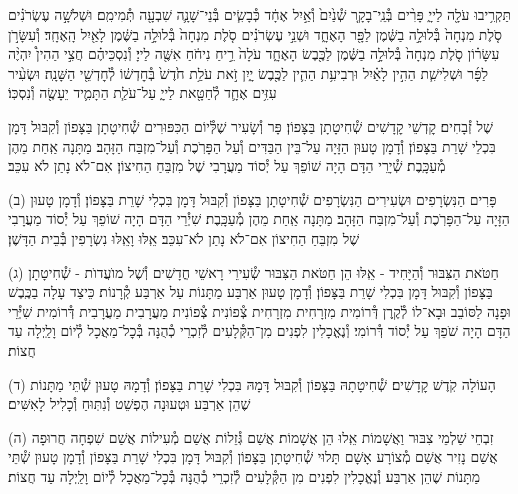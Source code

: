 \documentclass[twoside, openany, parskip=half, 11pt]{book}
\begin{document}
תַּקְרִ֥יבוּ עֹלָ֖ה לַייָ֑ פָּרִ֨ים בְּ֯נֵֽי־בָקָ֤ר שְׁ֯נַ֙יִם֙ וְ֯אַ֣יִל אֶחָ֔ד כְּ֯בָשִׂ֧ים בְּ֯נֵי־שָׁנָ֛ה שִׁבְעָ֖ה תְּ֯מִימִֽם׃
וּשְׁלֹשָׁ֣ה עֶשְׂרֹנִ֗ים סֹ֤לֶת מִנְחָה֙ בְּ֯לוּלָ֣ה בַשֶּׁ֔מֶן לַפָּ֖ר הָאֶחָ֑ד וּשְׁנֵ֣י עֶשְׂרֹנִ֗ים סֹ֤לֶת מִנְחָה֙ בְּ֯לוּלָ֣ה בַשֶּׁ֔מֶן לָאַ֖יִל הָֽאֶחָֽד׃
וְ֯עִשָּׂרֹ֣ן עִשָּׂר֗וֹן סֹ֤לֶת מִנְחָה֙ בְּ֯לוּלָ֣ה בַשֶּׁ֔מֶן לַכֶּ֖בֶשׂ הָאֶחָ֑ד עֹלָה֙ רֵ֣יחַ נִיחֹ֔חַ אִשֶּׁ֖ה לַייָ׃
וְ֯נִסְכֵּיהֶ֗ם חֲצִ֣י הַהִין֩ יִהְיֶ֨ה לַפָּ֜ר וּשְׁלִישִׁ֧ת הַהִ֣ין לָאַ֗יִל וּרְבִיעִ֥ת הַהִ֛ין לַכֶּ֖בֶשׂ יָ֑יִן זֹ֣את עֹלַ֥ת חֹ֙דֶשׁ֙ בְּ֯חׇדְשׁ֔וֹ לְ֯חׇדְשֵׁ֖י הַשָּׁנָֽה׃
וּשְׂעִ֨יר עִזִּ֥ים אֶחָ֛ד לְ֯חַטָּ֖את לַייָ֑ עַל־עֹלַ֧ת הַתָּמִ֛יד יֵעָשֶׂ֖ה וְ֯נִסְכּֽוֹ׃

%
שֶׁל זְ֯בָחִים׃ קׇדְשֵׁי קׇדָשִׁים שְׁ֯חִיטָתָן בַּצָּפוֹן׃ פָּר וְ֯שָׂעִיר שֶׁלְּ֯יוֹם הַכִּפּוּרִים שְׁ֯חִיטָתָן בַּצָּפוֹן וְ֯קִבּוּל דָּמָן בִּכְלֵי שָׁרֵת בַּצָּפוֹן׃ וְ֯דָמָן טָעוּן הַזָּיָה עַל־בֵּין הַבַּדִּים וְ֯עַל הַפָּרֹֽכֶת וְ֯עַל־מִזְבַּח הַזָּהָב׃ מַתָּנָה אַֽחַת מֵהֶן מְ֯עַכָּֽבֶת׃ שְׁ֯יָרֵי הַדָּם הָיָה שׁוֹפֵךְ עַל יְ֯סוֹד מַעֲרָבִי שֶׁל מִזְבֵּחַ הַחִיצוֹן׃ אִם־לֹא נָתַן לֹא עִכֵּב׃

(ב) פָּרִים הַנִּשְׂרָפִים וּשְׂעִירִים הַנִּשְׂרָפִים שְׁ֯חִיטָתָן בַּצָּפוֹן וְ֯קִבּוּל דָּמָן בִּכְלִי שָׁרֵת בַּצָּפוֹן׃ וְ֯דָמָן טָעוּן הַזָּיָה עַל־הַפָּרֹֽכֶת וְ֯עַל־מִזְבַּח הַזָּהָב׃ מַתָּנָה אַֽחַת מֵהֶן מְ֯עַכָּֽבֶת׃ שִׁיְ֯רֵי הַדָּם הָיָה שׁוֹפֵךְ עַל יְ֯סוֹד מַעֲרָבִי שֶׁל מִזְבֵּחַ הַחִיצוֹן אִם־לֹא נָתַן לֹא־עִכֵּב׃ אֵֽלּוּ וָאֵֽלּוּ נִשְׂרָפִין בְּ֯בֵית הַדָּשֶׁן׃

(ג) חַטֹּאת הַצִּבּוּר וְ֯הַיָּחִיד - אֵֽלּוּ הֵן חַטֹּאת הַצִּבּוּר שְׂ֯עִירֵי רָאשֵׁי חֳדָשִׁים וְ֯שֶׁל מוׁעֲדוׂת - שְׁ֯חִיטָתָן בַּצָּפוֹן וְ֯קִבּוּל דָּמָן בִּכְלִי שָׁרֵת בַּצָּפוֹן׃ וְ֯דָמָן טָעוּן אַרְבַּע מַתָּנוֹת עַל אַרְבַּע קְ֯רָנוֹת׃ כֵּיצַד עָלָה בַכֶּֽבֶשׁ וּפָנָה לַסּוֹבֵב וּבָא־לוֹ לְ֯קֶֽרֶן דְּ֯רוֹמִית מִזְרָחִית מִזְרָחִית צְ֯פוֹנִית צְ֯פוֹנִית מַעֲרָבִית מַעֲרָבִית דְּ֯רוֹמִית שִׁיְּ֯רֵי הַדָּם הָיָה שֹׁפֵךְ עַל יְ֯סוֹד דְּ֯רוֹמִי׃ וְ֯נֶאֱכָלִין לִפְנִים מִן־הַקְּ֯לָעִים לְ֯זִכְרֵי כְ֯הֻנָּה בְּ֯כׇל־מַאֲכָל לְ֯יוֹם וָלַֽיְלָה עַד חֲצוֹת׃

(ד) הָעוֹלָה קֹֽדֶשׁ קׇדָשִׁים׃ שְׁ֯חִיטָתָהּ בַּצָּפוֹן וְ֯קִבּוּל דָּמָהּ בִּכְלִי שָׁרֵת בַּצָּפוֹן׃ וְ֯דָמָהּ טָעוּן שְׁ֯תֵּי מַתָּנוֹת שֶׁהֵן אַרְבַּע וּטְעוּנָה הֶפְשֵׁט וְ֯נִתּֽוּחַ וְ֯כָלִיל לָאִשִּׁים׃

(ה) זִבְחֵי שַׁלְמֵי צִבּוּר וַאֲשָׁמוֹת אֵֽלוּ הֵן אֲשָׁמוֹת׃ אֲשַׁם גְּ֯זֵלוֹת אֲשַׁם מְ֯עִילוֹת אֲשַׁם שִׁפְחָה חֲרוּפָה אֲשַׁם נָזִיר אֲשַׁם מְ֯צוֹרָע אָשָׁם תָּלוּי שְׁ֯חִיטָתָן בַּצָּפוֹן וְ֯קִבּוּל דָּמָן בִּכְלִי שָׁרֵת בַּצָּפוֹן וְ֯דָמָן טָעוּן שְׁ֯תֵּי מַתָּנוֹת שֶׁהֵן אַרְבַּע׃ וְ֯נֶאֱכָלִין לִפְנִים מִן הַקְּ֯לָעִים לְ֯זִכְרֵי כְ֯הֻנָּה בְּ֯כׇל־מַאֲכָל לְ֯יוֹם וָלַֽיְלָה עַד חֲצוֹת׃
\end{document}
